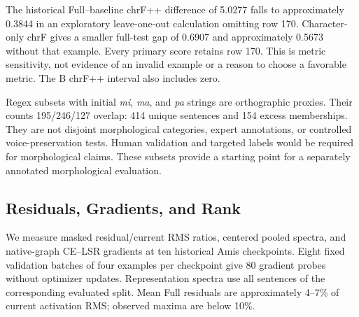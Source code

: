 \documentclass[11pt]{article}
\begin{document}
The historical Full--baseline chrF++ difference of 5.0277 falls to approximately 0.3844 in an exploratory leave-one-out calculation omitting row 170. Character-only chrF gives a smaller full-test gap of 0.6907 and approximately 0.5673 without that example. Every primary score retains row 170. This is metric sensitivity, not evidence of an invalid example or a reason to choose a favorable metric. The B chrF++ interval also includes zero.

Regex subsets with initial \textit{mi}, \textit{ma}, and \textit{pa} strings are orthographic proxies. Their counts 195/246/127 overlap: 414 unique sentences and 154 excess memberships. They are not disjoint morphological categories, expert annotations, or controlled voice-preservation tests. Human validation and targeted labels would be required for morphological claims. These subsets provide a starting point for a separately annotated morphological evaluation.

\subsection{Residuals, Gradients, and Rank}
\begin{table}[!ht]
\centering
\caption{Historical selected-checkpoint diagnostics: source effective rank from centered singular-value entropy; mean residual/current RMS ratio; mean weighted LSR/CE gradient norm ratio over eight fixed validation batches. FT auxiliary gradients are counterfactual and not its training objective.}
\label{tab:mechanisms}
\renewcommand{\arraystretch}{1.15}
\end{table}
We measure masked residual/current RMS ratios, centered pooled spectra, and native-graph CE--LSR gradients at ten historical Amis checkpoints. Eight fixed validation batches of four examples per checkpoint give 80 gradient probes without optimizer updates. Representation spectra use all sentences of the corresponding evaluated split. Mean Full residuals are approximately 4--7\% of current activation RMS; observed maxima are below 10\%.
\end{document}
